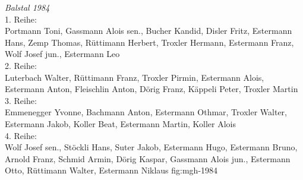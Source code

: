 {\emph{Balstal 1984}\\
    1. Reihe:\\
    Portmann Toni, Gassmann Alois sen., Bucher Kandid, Disler Fritz, Estermann
    Hans, Zemp Thomas, Rüttimann Herbert, Troxler Hermann, Estermann Franz, Wolf
    Josef jun., Estermann Leo\\
    2. Reihe:\\
    Luterbach Walter, Rüttimann Franz, Troxler Pirmin, Estermann Alois,
    Estermann Anton, Fleischlin Anton, Dörig Franz, Käppeli Peter, Troxler
    Martin\\
    3. Reihe:\\
    Emmenegger Yvonne, Bachmann Anton, Estermann Othmar, Troxler Walter,
    Estermann Jakob, Koller Beat, Estermann Martin, Koller Alois\\
    4. Reihe:\\
    Wolf Josef sen., Stöckli Hans, Suter Jakob, Estermann Hugo, Estermann Bruno,
    Arnold Franz, Schmid Armin, Dörig Kaspar, Gassmann Alois jun., Estermann
    Otto, Rüttimann Walter, Estermann Niklaus } {fig:mgh-1984}

